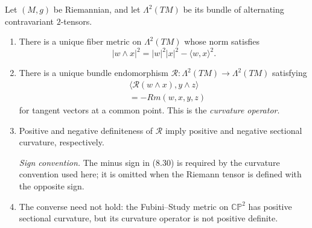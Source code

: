 \begin{proposition}
\label{prop:curvature-operator}

Let $(M,g)$ be Riemannian, and let $\Lambda^2(TM)$ be its bundle of
alternating contravariant $2$-tensors.
\begin{enumerate}
\item[(a)] There is a unique fiber metric on $\Lambda^2(TM)$ whose
norm satisfies
\[
|w\wedge x|^2=|w|^2|x|^2-\langle w,x\rangle^2.
\]
\item[(b)] There is a unique bundle endomorphism
$\mathcal R:\Lambda^2(TM)\to\Lambda^2(TM)$ satisfying
\begin{equation}
\begin{aligned}
&\langle\mathcal R(w\wedge x),y\wedge z\rangle\\
&=-Rm(w,x,y,z)
\end{aligned}
\tag{8.30}
\end{equation}
for tangent vectors at a common point. This is the \emph{curvature operator}.
\item[(c)] Positive and negative definiteness of $\mathcal R$ imply positive
and negative sectional curvature, respectively.

\emph{Sign convention.} The minus sign in (8.30) is required by the curvature
convention used here; it is omitted when the Riemann tensor is defined with
the opposite sign.
\item[(d)] The converse need not hold: the Fubini--Study metric on
$\mathbb{CP}^2$ has positive sectional curvature, but its curvature operator
is not positive definite.
\end{enumerate}
\end{proposition}

